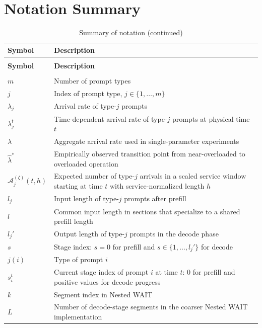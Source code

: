 \section{Notation Summary}
\label{app:notation}

\begin{center}
\small
\begin{longtable}{>{\raggedright\arraybackslash}p{}p{}}
\caption{Summary of notation}
\label{tab:notation}\\
\toprule
\textbf{Symbol} & \textbf{Description} \\
\midrule
\endfirsthead
\caption[]{Summary of notation (continued)}\\
\toprule
\textbf{Symbol} & \textbf{Description} \\
\midrule
\endhead
\midrule
\multicolumn{2}{r}{Continued on next page}\\
\endfoot
\bottomrule
\endlastfoot
$m$ & Number of prompt types \\
$j$ & Index of prompt type, $j \in \{1, \dots, m\}$ \\
$\lambda_j$ & Arrival rate of type-$j$ prompts \\
$\lambda_j^t$ & Time-dependent arrival rate of type-$j$ prompts at physical time $t$ \\
$\lambda$ & Aggregate arrival rate used in single-parameter experiments \\
$\hat{\lambda}^*$ & Empirically observed transition point from near-overloaded to overloaded operation \\
$\mathcal A_j^{(\zeta)}(t,h)$ & Expected number of type-$j$ arrivals in a scaled service window starting at time $t$ with service-normalized length $h$ \\
$l_j$ & Input length of type-$j$ prompts after prefill \\
$l$ & Common input length in sections that specialize to a shared prefill length \\
$l_j'$ & Output length of type-$j$ prompts in the decode phase \\
$s$ & Stage index: $s=0$ for prefill and $s \in \{1, \dots, l_j'\}$ for decode \\
$j(i)$ & Type of prompt $i$ \\
$s_i^t$ & Current stage index of prompt $i$ at time $t$: $0$ for prefill and positive values for decode progress \\
$k$ & Segment index in Nested WAIT \\
$L$ & Number of decode-stage segments in the coarser Nested WAIT implementation \\

\end{longtable}
\end{center}
